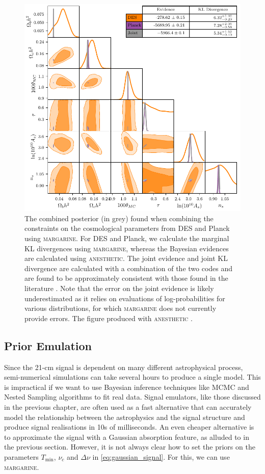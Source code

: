 \begin{figure}
    \centering
    \includegraphics{margarine/figs/paper_plot.pdf}
    \caption{The combined posterior (in grey) found when combining the constraints on the cosmological parameters from DES and Planck using \textsc{margarine}. For DES and Planck, we calculate the marginal KL divergences using \textsc{margarine}, whereas the Bayesian evidences are calculated using \textsc{anesthetic}. The joint evidence and joint KL divergence are calculated with a combination of the two codes and are found to be approximately consistent with those found in the literature \cite{Handley_tensions_2019, Handley_dimensionality_2019}. Note that the error on the joint evidence is likely underestimated as it relies on evaluations of log-probabilities for various distributions, for which \textsc{margarine} does not currently provide errors. The figure produced with \textsc{anesthetic} \cite{anesthetic}.}
    \label{fig:joint}
\end{figure}

\subsection{Prior Emulation}

Since the 21-cm signal is dependent on many different astrophysical process, semi-numerical simulations can take several hours to produce a single model. This is impractical if we want to use Bayesian inference techniques like MCMC and Nested Sampling algorithms to fit real data. Signal emulators, like those discussed in the previous chapter, are often used as a fast alternative that can accurately model the relationship between the astrophysics and the signal structure and produce signal realisations in 10s of milliseconds. An even cheaper alternative is to approximate the signal with a Gaussian absorption feature, as alluded to in the previous section. However, it is not always clear how to set the priors on the parameters $T_\mathrm{min}$, $\nu_c$ and $\Delta \nu$ in \cref{eq:gaussian_signal}. For this, we can use \textsc{margarine}.


